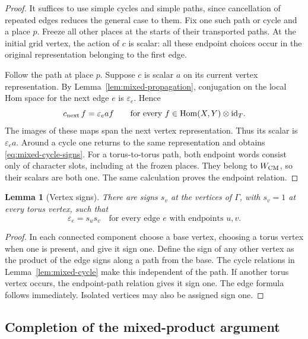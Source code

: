 \documentclass[11pt]{article}
\numberwithin{equation}{section}
\newtheorem{lemma}[theorem]{Lemma}
\theoremstyle{definition}
\theoremstyle{remark}
\DeclareMathOperator{\Hom}{Hom}
\begin{document}
\begin{proof}
It suffices to use simple cycles and simple paths, since cancellation
of repeated edges reduces the general case to them.  Fix one such
path or cycle and a place $p$.  Freeze all other places at the
starts of their transported paths.  At the initial grid vertex,
the action of $c$ is scalar: all these endpoint choices occur in
the original representation belonging to the first edge.

Follow the path at place $p$.  Suppose $c$ is scalar $a$ on its
current vertex representation.  By
Lemma~\ref{lem:mixed-propagation}, conjugation on the local Hom
space for the next edge $e$ is $\varepsilon_e$.  Hence
\[
 c_{\rm next}\,f=\varepsilon_e a f
 \qquad
 \text{for every }f\in\Hom(X,Y)\otimes\mathrm{id}_T.
\]
The images of these maps span the next vertex representation.
Thus its scalar is $\varepsilon_e a$.  Around a cycle one returns
to the same representation and obtains
\eqref{eq:mixed-cycle-signs}.  For a torus-to-torus path, both
endpoint words consist only of character slots, including at the
frozen places.  They belong to $W_{\rm CM}$, so their scalars are
both one.  The same calculation proves the endpoint relation.
\end{proof}

\begin{lemma}[Vertex signs]\label{lem:mixed-node-signs}
There are signs $s_v$ at the vertices of $\Gamma$, with $s_v=1$
at every torus vertex, such that
\[
 \varepsilon_e=s_us_v
 \quad\text{for every edge }e\text{ with endpoints }u,v.
\]
\end{lemma}

\begin{proof}
In each connected component choose a base vertex, choosing a torus
vertex when one is present, and give it sign one.  Define the sign
of any other vertex as the product of the edge signs along a path
from the base.  The cycle relations in
Lemma~\ref{lem:mixed-cycle} make this independent of the path.
If another torus vertex occurs, the endpoint-path relation gives
it sign one.  The edge formula follows immediately.  Isolated
vertices may also be assigned sign one.
\end{proof}

\subsection{Completion of the mixed-product argument}
\end{document}
